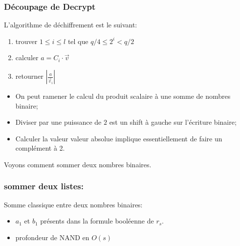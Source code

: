 \documentclass[11pt,xcolor={usenames,dvipsnames}]{beamer}
\begin{document}

\begin{frame}
\frametitle{Découpage de Decrypt}
L'algorithme de déchiffrement est le suivant:
\begin{enumerate}
\item trouver $1 \leqslant i \leqslant l$ tel que $q/4 \leqslant 2^i < q/2$
\item calculer $a = C_i \cdot \vec{v}$
\item retourner $|\frac{a}{\vec{v}_i}|$
\end{enumerate}

\begin{itemize}
\item On peut ramener le calcul du produit scalaire à une somme de nombres binaire;
\item Diviser par une puissance de $2$ est un shift à gauche sur l'écriture binaire;
\item Calculer la valeur valeur absolue implique essentiellement de faire un complément à 2.
\end{itemize}

Voyons comment sommer deux nombres binaires.

\end{frame} 


\begin{frame} 
\frametitle{sommer deux listes: }
Somme classique entre deux nombres binaires:
  \begin{figure}
    \begin{center}
      \begin{tikzpicture}[scale = 1.2, transform shape]
      	
      \end{tikzpicture}
    \end{center}
  \end{figure}
\begin{itemize}
\item $a_1$ et $b_1$ présents dans la formule booléenne de $r_s$.
\item profondeur de NAND en $O(s)$
\end{itemize}
\end{frame} 
    
\end{document}
